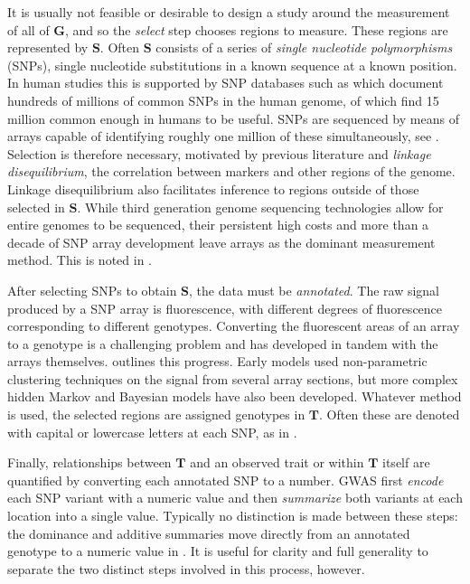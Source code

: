 \documentclass[12pt]{article}
\newcommand{\m}[1]{\mathbf{#1}}               %
\begin{document}
It is usually not feasible or desirable to design a study around the measurement of all of $\m{G}$, and so the \emph{select} step chooses regions to measure. These regions are represented by $\m{S}$. Often $\m{S}$ consists of a series of \emph{single nucleotide polymorphisms} (SNPs), single nucleotide substitutions in a known sequence at a known position. In human studies this is supported by SNP databases such as \cite{NCBIdbSNP} which document hundreds of millions of common SNPs in the human genome, of which \cite{koboldtetal2013next} find 15 million common enough in humans to be useful. SNPs are sequenced by means of arrays capable of identifying roughly one million of these simultaneously, see \cite{laframboise2009, tametal2019benefits}. Selection is therefore necessary, motivated by previous literature and \emph{linkage disequilibrium}, the correlation between markers and other regions of the genome. Linkage disequilibrium also facilitates inference to regions outside of those selected in $\m{S}$. While third generation genome sequencing technologies allow for entire genomes to be sequenced, their persistent high costs and more than a decade of SNP array development leave arrays as the dominant measurement method. This is noted in \cite{heatherchain2016sequencers, hasinetal2017multi, uffelmannetal2021gwas}.

After selecting SNPs to obtain $\m{S}$, the data must be \emph{annotated}. The raw signal produced by a SNP array is fluorescence, with different degrees of fluorescence corresponding to different genotypes. Converting the fluorescent areas of an array to a genotype is a challenging problem and has developed in tandem with the arrays themselves. \cite{laframboise2009} outlines this progress. Early models used non-parametric clustering techniques on the signal from several array sections, but more complex hidden Markov and Bayesian models have also been developed. Whatever method is used, the selected regions are assigned genotypes in $\m{T}$. Often these are denoted with capital or lowercase letters at each SNP, as in \cite{siegmundyakir2007, visschergoddard2019}.

Finally, relationships between $\m{T}$ and an observed trait or within $\m{T}$ itself are quantified by converting each annotated SNP to a number. GWAS first \emph{encode} each SNP variant with a numeric value and then \emph{summarize} both variants at each location into a single value. Typically no distinction is made between these steps: the dominance and additive summaries move directly from an annotated genotype to a numeric value in \cite{LanderBotstein1989, cheverud2001, siegmundyakir2007}. It is useful for clarity and full generality to separate the two distinct steps involved in this process, however.
\end{document}
